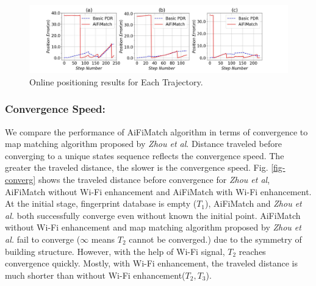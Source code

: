 \documentclass{llncs}
\begin{document}
\begin{figure}[!htbp]
	\vspace{-10pt}
	\centering
	\includegraphics[width=4.6in]{AiFiMatch-OnlinePosition}
	\caption{Online positioning results for Each Trajectory.}
	\label{fig-online}
	\vspace{-20pt}
\end{figure}

\subsubsection{Convergence Speed:}

We compare the performance of AiFiMatch algorithm in terms of convergence to map matching algorithm proposed by \emph{Zhou et al}. Distance traveled before converging to a unique states sequence reflects the convergence speed. The greater the traveled distance, the slower is the convergence speed. Fig. \ref{fig-converg} shows the traveled distance before convergence for \emph{Zhou et al}, AiFiMatch without Wi-Fi enhancement and AiFiMatch with Wi-Fi enhancement. At the initial stage, fingerprint database is empty ($T_1$), AiFiMatch and \emph{Zhou et al.} both successfully converge even without known the initial point. AiFiMatch without Wi-Fi enhancement and map matching algorithm proposed by \emph{Zhou et al.} fail to converge ($\infty$ means $T_2$ cannot be converged.) due to the symmetry of building structure. However, with the help of Wi-Fi signal, $T_2$ reaches convergence quickly. Mostly, with Wi-Fi enhancement, the traveled distance is much shorter than without Wi-Fi enhancement($T_2, T_3$). 

\end{document}
